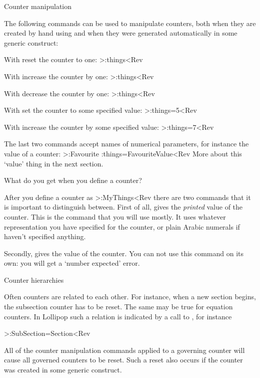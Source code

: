 \SubSection Counter manipulation

The following commands can be used to manipulate counters, both when
they are created by hand using  and when they were
generated automatically in some generic construct:

With  reset the counter to one:
 \Ver>\StartCounter:things<Rev

With  increase the counter by one:
 \Ver>\StepCounter:things<Rev

With  decrease the counter by one:
 \Ver>\BackStepCounter:things<Rev

With  set the counter to some specified value:
 \Ver>\SetCounter:things=5<Rev

With  increase the counter by some
specified value:
 \Ver>\AddToCounter:things=7<Rev

The last two commands accept names of numerical parameters, for
instance the value of a counter:
 \Ver>\NewCounter:Favourite
\AddToCounter:things=FavouriteValue<Rev
More about this `value' thing in the next section.

\SubSection What do you get when you define a counter?

After you define a counter as \Ver>\NewCounter:MyThings<Rev there are
two commands that it is important to distinguish between. First of
all,  gives the {\it printed\/} value of the
counter. This is the command that you will use mostly. It uses
whatever representation you have specified for the counter, or plain
Arabic numerals if haven't specified anything.

Secondly,  gives the value of the counter. You can
not use this command on its own: you will get a `number expected'
error.

\SubSection Counter hierarchies

Often counters are related to each other. For instance, when a new
section begins, the subsection counter has to be reset. The same may
be true for equation counters. In Lollipop such a relation is
indicated by a call to , for instance

\Ver>\GoverningCounter:SubSection=Section<Rev

All of the counter manipulation commands applied to a governing
counter will cause all governed counters to be reset. Such a reset
also occurs if the counter was created in some generic construct.


